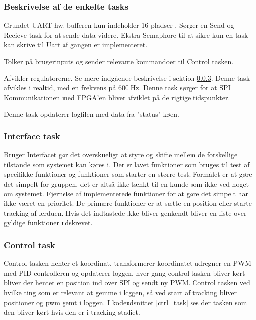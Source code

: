 \subsubsection{Beskrivelse af de enkelte tasks}
\begin{description}
\itemsep-3pt
	\item[UART] Grundet UART hw. bufferen kun indeholder 16 pladser \citep[Side. 430]{lm3s6965}. Sørger en Send og Recieve task for at sende data videre. Ekstra Semaphore til at sikre kun en task kan skrive til Uart af gangen er implementeret.
	\item[Interface] Tolker på brugerinputs og sender relevante kommandoer til Control tasken.
	\item[Control] Afvikler regulatorerne. Se mere indgående beskrivelse i sektion \ref{sec:control_task}. Denne task afvikles i realtid, med en frekvens på 600 Hz. 
	Denne task sørger for at SPI Kommunikationen med FPGA'en bliver afviklet på de rigtige tidspunkter.
	\item[Logger] Denne task opdaterer logfilen med data fra "status" køen.
\end{description}

\subsubsection{Interface task}
\label{sec:interface}
Bruger Interfacet gør det overskueligt at styre og skifte mellem de forskellige tilstande som systemet kan køres i.
Der er lavet funktioner som bruges til test af specifikke funktioner og funktioner som starter en større test.
Formålet er at gøre det simpelt for gruppen, det er altså ikke tænkt til en kunde som ikke ved noget om systemet.
Fjernelse af implementerede funktioner for at gøre det simpelt har ikke været en prioritet. 
De primære funktioner er at sætte en position eller starte tracking af lerduen.
Hvis det indtastede ikke bliver genkendt bliver en liste over gyldige funktioner udskrevet.

\subsubsection{Control task}
\label{sec:control_task}

Control tasken henter et koordinat, transformerer koordinatet udregner en PWM med PID controlleren og opdaterer loggen.
hver gang control tasken bliver kørt bliver der hentet en position ind over SPI og sendt ny PWM. 
Control tasken ved hvilke ting som er relevant at gemme i loggen, så ved start af tracking bliver positioner og pwm gemt i loggen.
I kodeudsnittet \ref{ctrl_task} ses der tasken som den bliver kørt hvis den er i tracking stadiet.

